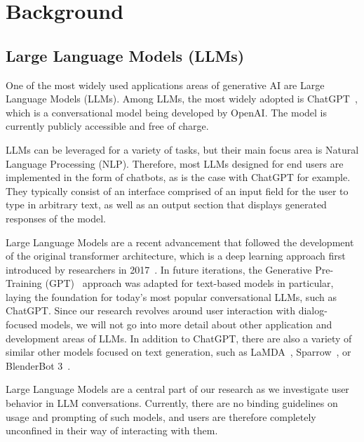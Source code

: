 \section{Background}
\label{sec:background}


\subsection{Large Language Models (LLMs)}
\label{subsec:large-language-models-(llms)}
One of the most widely used applications areas of generative AI are Large Language Models (LLMs).
Among LLMs, the most widely adopted is ChatGPT~\cite{openai_chatgpt_2023}, which is a
conversational model being developed by OpenAI\@.
The model is currently publicly accessible and free of charge.

LLMs can be leveraged for a variety of tasks, but their main focus area is Natural Language Processing
(NLP).
Therefore, most LLMs designed for end users are implemented in the form of chatbots,
as is the case with ChatGPT for example.
They typically consist of an interface comprised of an input field for the user to type in arbitrary
text, as well as an output section that displays generated responses of the model.

Large Language Models are a recent advancement that followed the development of the original
transformer architecture, which is a deep learning approach first introduced by researchers in 2017~\cite{vaswani_attention_2017}.
In future iterations, the Generative Pre-Training (GPT)~\cite{radford_improving_2018} approach
was adapted for text-based models in particular, laying the foundation for today's most
popular conversational LLMs, such as ChatGPT\@.
Since our research revolves around user interaction with dialog-focused models, we will not go into
more detail about other application and development areas of LLMs.
In addition to ChatGPT, there are also a variety of similar other models focused on text generation,
such as LaMDA~\cite{thoppilan_lamda_2022}, Sparrow~\cite{glaese_improving_2022}, or
BlenderBot 3~\cite{shuster_blenderbot_2022}.


Large Language Models are a central part of our research as we investigate user behavior in LLM
conversations.
Currently, there are no binding guidelines on usage and prompting of such models,
and users are therefore completely unconfined in their way of interacting with them.

